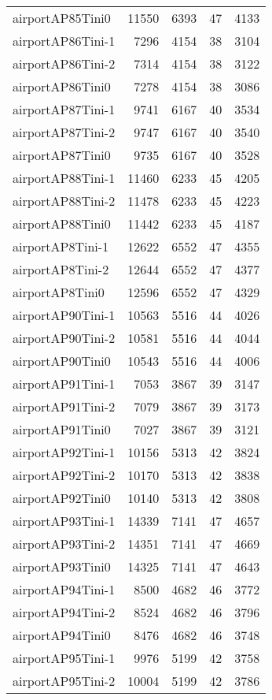 \begin{longtable}{lrrrr}
airportAP85Tini0 & 11550 & 6393 & 47 & 4133 \\
airportAP86Tini-1 & 7296 & 4154 & 38 & 3104 \\
airportAP86Tini-2 & 7314 & 4154 & 38 & 3122 \\
airportAP86Tini0 & 7278 & 4154 & 38 & 3086 \\
airportAP87Tini-1 & 9741 & 6167 & 40 & 3534 \\
airportAP87Tini-2 & 9747 & 6167 & 40 & 3540 \\
airportAP87Tini0 & 9735 & 6167 & 40 & 3528 \\
airportAP88Tini-1 & 11460 & 6233 & 45 & 4205 \\
airportAP88Tini-2 & 11478 & 6233 & 45 & 4223 \\
airportAP88Tini0 & 11442 & 6233 & 45 & 4187 \\
airportAP8Tini-1 & 12622 & 6552 & 47 & 4355 \\
airportAP8Tini-2 & 12644 & 6552 & 47 & 4377 \\
airportAP8Tini0 & 12596 & 6552 & 47 & 4329 \\
airportAP90Tini-1 & 10563 & 5516 & 44 & 4026 \\
airportAP90Tini-2 & 10581 & 5516 & 44 & 4044 \\
airportAP90Tini0 & 10543 & 5516 & 44 & 4006 \\
airportAP91Tini-1 & 7053 & 3867 & 39 & 3147 \\
airportAP91Tini-2 & 7079 & 3867 & 39 & 3173 \\
airportAP91Tini0 & 7027 & 3867 & 39 & 3121 \\
airportAP92Tini-1 & 10156 & 5313 & 42 & 3824 \\
airportAP92Tini-2 & 10170 & 5313 & 42 & 3838 \\
airportAP92Tini0 & 10140 & 5313 & 42 & 3808 \\
airportAP93Tini-1 & 14339 & 7141 & 47 & 4657 \\
airportAP93Tini-2 & 14351 & 7141 & 47 & 4669 \\
airportAP93Tini0 & 14325 & 7141 & 47 & 4643 \\
airportAP94Tini-1 & 8500 & 4682 & 46 & 3772 \\
airportAP94Tini-2 & 8524 & 4682 & 46 & 3796 \\
airportAP94Tini0 & 8476 & 4682 & 46 & 3748 \\
airportAP95Tini-1 & 9976 & 5199 & 42 & 3758 \\
airportAP95Tini-2 & 10004 & 5199 & 42 & 3786 \\

\end{longtable}
